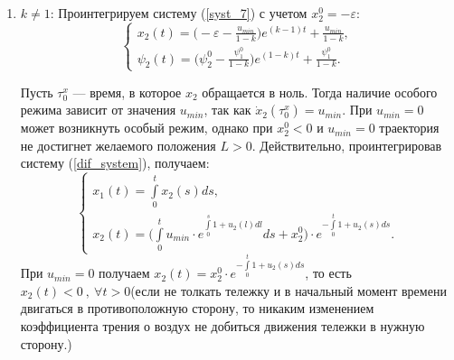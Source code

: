 \documentclass[10pt]{article}
\begin{document}
\begin{enumerate}
	\item \( k \ne 1 \): Проинтегрируем систему (\ref{syst_7}) с учетом \( x_2^0 = -\varepsilon \):
		\begin{equation}\label{syst_8}
			\begin{cases}
				x_2(t) = \big(-\varepsilon - \frac{u_{min}}{1 - k} \big) e^{(k-1)t} + \frac{u_{min}}{1 - k},
				\\
				\psi_2(t) = \big( \psi_2^0 - \frac{\psi_1^0}{1- k} \big) e^{(1 - k)t}+\frac{\psi_1^0}{1 - k}.
			\end{cases}
		\end{equation}
	
	Пусть \( \tau_0^x \) --- время, в которое \( x_2 \) обращается в ноль. Тогда наличие особого режима зависит от значения \( u_{min} \), так как \( \dot{x}_2(\tau_0^x) = u_{min} \). При \( u_{min} = 0 \) может возникнуть особый режим, однако при \( x_2^0 < 0 \) и \(u_{min} = 0 \) траектория не достигнет желаемого положения \( L > 0\). Действительно, проинтегрировав систему (\ref{dif_system}), получаем:
	\[ \begin{cases}
		x_1(t) = \int\limits_0^t x_2(s) ds,
		\\
		x_2(t) = \Big( \int\limits_0^t u_{min} \cdot e^{\int\limits_0^s 1 + u_2(l) dl}ds + x_2^0 \Big) \cdot e^{-\int\limits_0^t 1 + u_2(s) ds}.
	\end{cases} \]
	При \( u_{min} = 0 \) получаем \( x_2(t) = x_2^0 \cdot e^{-\int\limits_0^t 1 + u_2(s) ds} \), то есть \( x_2(t) < 0 \ , \ \forall t > 0 \)(если не толкать тележку и в начальный момент времени двигаться в противоположную сторону, то никаким изменением коэффициента трения о воздух не добиться движения тележки в нужную сторону.)
	

\end{enumerate}
\end{document}
